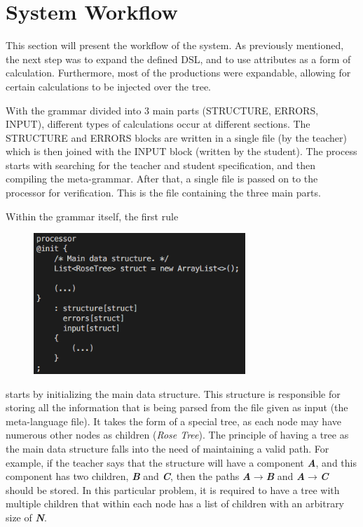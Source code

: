 \chapter{System Workflow} \label{system_workflow}

This section will present the workflow of the system. As previously mentioned, the next step was to expand the defined DSL, and to use attributes as a form of calculation. Furthermore, most of the productions were expandable, allowing for certain calculations to be injected over the tree.

With the grammar divided into 3 main parts (STRUCTURE, ERRORS, INPUT), different types of calculations occur at different sections. The STRUCTURE and ERRORS blocks are written in a single file (by the teacher) which is then joined with the INPUT block (written by the student). The process starts with searching for the teacher and student specification, and then compiling the meta-grammar. After that, a single file is passed on to the processor for verification. This is the file containing the three main parts.

Within the grammar itself, the first rule
\begin{figure}[h]
    \centering
    \includegraphics[width=8cm]{images/processor_expanded.png}
\end{figure}


\noindent starts by initializing the main data structure. This structure is responsible for storing all the information that is being parsed from the file given as input (the meta-language file). It takes the form of a special tree, as each node may have numerous other nodes as children (\emph{Rose Tree}). The principle of having a tree as the main data structure falls into the need of maintaining a valid path. For example, if the teacher says that the structure will have a component \emph{\textbf{A}}, and this component has two children, \emph{\textbf{B}} and \emph{\textbf{C}}, then the paths \emph{\textbf{A$\rightarrow$B}} and \emph{\textbf{A$\rightarrow$C}} should be stored. In this particular problem, it is required to have a tree with multiple children that within each node has a list of children with an arbitrary size of \emph{\textbf{N}}.

